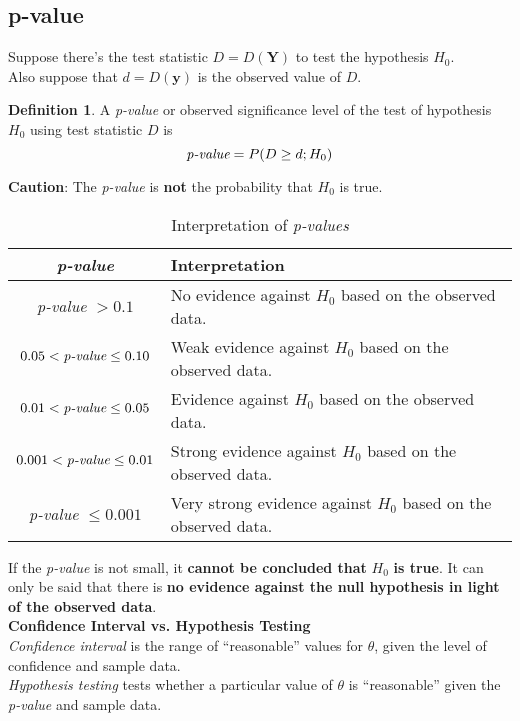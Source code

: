 \documentclass[12pt]{article}
\theoremstyle{definition}
\newtheorem*{defn}{Definition}
\begin{document}
  \subsection{p-value}
  Suppose there's the test statistic $D = D(\textbf{Y})$ to test the hypothesis $H_{0}$. \\
  Also suppose that $d = D(\textbf{y})$ is the observed value of $D$.
  \begin{defn}
    A \emph{p-value} or observed significance level of the test of hypothesis $H_{0}$ using test statistic $D$ is
    $$\emph{p-value} = P(D \geq d; H_{0})$$
  \end{defn}
  \textbf{Caution}: The \emph{p-value} is \textbf{not} the probability that $H_{0}$ is true.
  \begin{table}[H]
  \caption{Interpretation of \emph{p-values}}
  \begin{center}
  \begin{tabular}{c | p{9cm}}
    \bf \emph{p-value} & \bf Interpretation \\ \hline \hline
    \emph{p-value} $> 0.1$ & No evidence against $H_0$ based on the observed data. \\ \hline
    $0.05 < \emph{p-value} \leq 0.10$ & Weak evidence against $H_0$ based on the observed data. \\ \hline
    $0.01 < \emph{p-value} \leq 0.05$ & Evidence against $H_0$ based on the observed data. \\ \hline
    $0.001 < \emph{p-value} \leq 0.01$ & Strong evidence against $H_0$ based on the observed data. \\ \hline
    \emph{p-value} $\leq 0.001$ & Very strong evidence against $H_0$ based on the observed data.
  \end{tabular}
  \end{center}
  \end{table}
  If the \emph{p-value} is not small, it \textbf{cannot be concluded that} $H_{0}$ \textbf{is true}.
  It can only be said that there is \textbf{no evidence against the null hypothesis in light of the observed data}. \\

  \textbf{Confidence Interval vs. Hypothesis Testing} \\
  \emph{Confidence interval} is the range of ``reasonable'' values for $\theta$, given the level of confidence and sample data. \\
  \emph{Hypothesis testing} tests whether a particular value of $\theta$ is ``reasonable'' given the \emph{p-value} and sample data.
\end{document}
